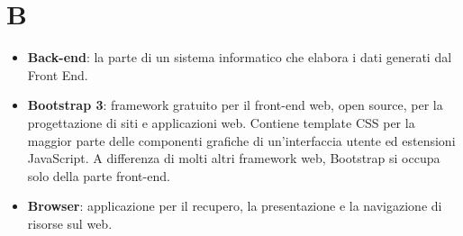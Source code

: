 \section{B}
\begin{itemize} 
	\item \textbf{Back-end}: la parte di un sistema informatico che elabora i dati generati dal Front End.
	\item \textbf{Bootstrap 3}: framework gratuito per il front-end web, open source, per la progettazione di siti e applicazioni web. Contiene template CSS per la maggior parte delle componenti grafiche di un'interfaccia utente ed estensioni JavaScript. A differenza di molti altri framework web, Bootstrap si occupa solo della parte front-end.
	\item \textbf{Browser}: applicazione per il recupero, la presentazione e la navigazione di risorse sul web.
\end{itemize}